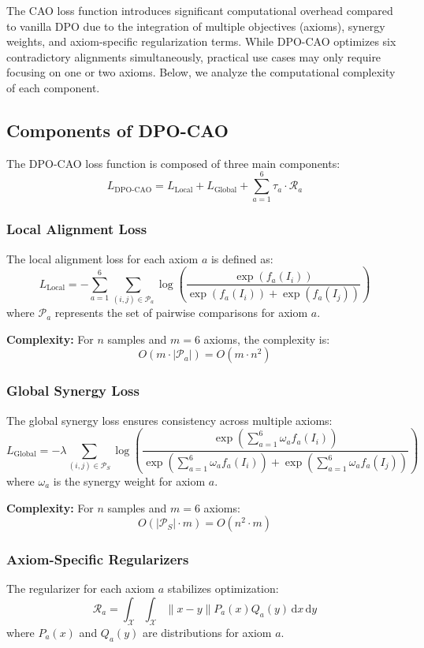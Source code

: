 The CAO loss function introduces significant computational overhead compared to vanilla DPO due to the integration of multiple objectives (axioms), synergy weights, and axiom-specific regularization terms. While DPO-CAO optimizes six contradictory alignments simultaneously, practical use cases may only require focusing on one or two axioms. Below, we analyze the computational complexity of each component.

\subsection{Components of DPO-CAO}
The DPO-CAO loss function is composed of three main components:
\[
L_{\text{DPO-CAO}} = L_{\text{Local}} + L_{\text{Global}} + \sum_{a=1}^6 \tau_a \cdot \mathcal{R}_a
\]

\subsubsection{Local Alignment Loss}
The local alignment loss for each axiom \(a\) is defined as:
\[
L_{\text{Local}} = - \sum_{a=1}^6 \sum_{(i, j) \in \mathcal{P}_a} \log \left( \frac{\exp(f_a(I_i))}{\exp(f_a(I_i)) + \exp(f_a(I_j))} \right)
\]
where \(\mathcal{P}_a\) represents the set of pairwise comparisons for axiom \(a\).

\textbf{Complexity:} For \(n\) samples and \(m = 6\) axioms, the complexity is:
\[
O(m \cdot |\mathcal{P}_a|) = O(m \cdot n^2)
\]

\subsubsection{Global Synergy Loss}
The global synergy loss ensures consistency across multiple axioms:
\[
L_{\text{Global}} = - \lambda \sum_{(i, j) \in \mathcal{P}_S} \log \left( \frac{\exp\left(\sum_{a=1}^6 \omega_a f_a(I_i)\right)}{\exp\left(\sum_{a=1}^6 \omega_a f_a(I_i)\right) + \exp\left(\sum_{a=1}^6 \omega_a f_a(I_j)\right)} \right)
\]
where \(\omega_a\) is the synergy weight for axiom \(a\).

\textbf{Complexity:} For \(n\) samples and \(m = 6\) axioms:
\[
O(|\mathcal{P}_S| \cdot m) = O(n^2 \cdot m)
\]

\subsubsection{Axiom-Specific Regularizers}
The regularizer for each axiom \(a\) stabilizes optimization:
\[
\mathcal{R}_a = \int_{\mathcal{X}} \int_{\mathcal{X}} \|x - y\| P_a(x) Q_a(y) \, \mathrm{d}x \, \mathrm{d}y
\]
where \(P_a(x)\) and \(Q_a(y)\) are distributions for axiom \(a\).

